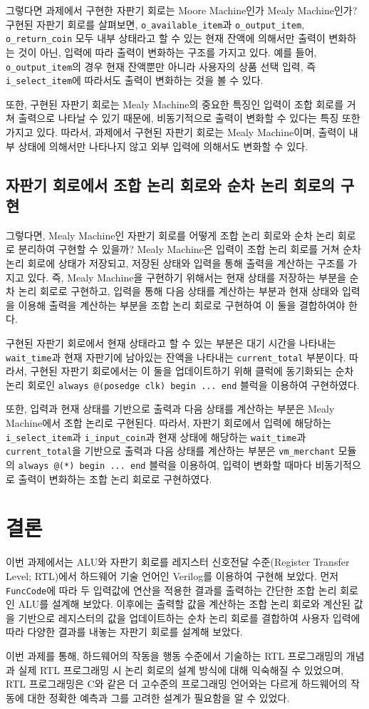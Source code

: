 \documentclass[openright, a4paper]{article}
\newcommand{\code}[1]{\texttt{#1}}
\begin{document}
그렇다면 과제에서 구현한 자판기 회로는 Moore Machine인가 Mealy Machine인가? 구현된 자판기 회로를 살펴보면, \code{o_available_item}과
\code{o_output_item}, \code{o_return_coin} 모두 내부 상태라고 할 수 있는 현재 잔액에 의해서만 출력이 변화하는 것이 아닌, 입력에 따라 출력이
변화하는 구조를 가지고 있다. 예를 들어, \code{o_output_item}의 경우 현재 잔액뿐만 아니라 사용자의 상품 선택 입력, 즉 \code{i_select_item}에
따라서도 출력이 변화하는 것을 볼 수 있다. 

또한, 구현된 자판기 회로는 Mealy Machine의 중요한 특징인 입력이 조합 회로를 거쳐 출력으로 나타날 수 있기 때문에, 비동기적으로 출력이 변화할
수 있다는 특징 또한 가지고 있다. 따라서, 과제에서 구현된 자판기 회로는 Mealy Machine이며, 출력이 내부 상태에 의해서만 나타나지 않고 외부 입력에 의해서도
변화할 수 있다.

\subsection{자판기 회로에서 조합 논리 회로와 순차 논리 회로의 구현}
그렇다면, Mealy Machine인 자판기 회로를 어떻게 조합 논리 회로와 순차 논리 회로로 분리하여 구현할 수 있을까?
Mealy Machine은 입력이 조합 논리 회로를 거쳐 순차 논리 회로에 상태가 저장되고, 저장된 상태와 입력을 통해 출력을 계산하는 구조를 가지고 있다.
즉, Mealy Machine을 구현하기 위해서는 현재 상태를 저장하는 부분을 순차 논리 회로로 구현하고, 입력을 통해 다음 상태를 계산하는 부분과
현재 상태와 입력을 이용해 출력을 계산하는 부분을 조합 논리 회로로 구현하여 이 둘을 결합하여야 한다.

구현된 자판기 회로에서 현재 상태라고 할 수 있는 부분은 대기 시간을 나타내는 \code{wait_time}과 현재 자판기에 남아있는 잔액을 나타내는
\code{current_total} 부분이다. 따라서, 구현된 자판기 회로에서는 이 둘을 업데이트하기 위해 클럭에 동기화되는 순차 논리 회로인
\code{always @(posedge clk) begin ... end} 블럭을 이용하여 구현하였다.

또한, 입력과 현재 상태를 기반으로 출력과 다음 상태를 계산하는 부분은 Mealy Machine에서 조합 논리로 구현된다. 따라서, 자판기 회로에서
입력에 해당하는 \code{i_select_item}과 \code{i_input_coin}과 현재 상태에 해당하는 \code{wait_time}과 \code{current_total}을 기반으로
출력과 다음 상태를 계산하는 부분은 \code{vm_merchant} 모듈의 \code{always @(*) begin ... end} 블럭을 이용하여, 입력이 변화할 때마다
비동기적으로 출력이 변화하는 조합 논리 회로로 구현하였다.

\section{결론}
이번 과제에서는 ALU와 자판기 회로를 레지스터 신호전달 수준(Register Transfer Level; RTL)에서 하드웨어 기술 언어인 Verilog를 이용하여
구현해 보았다. 먼저 \code{FuncCode}에 따라 두 입력값에 연산을 적용한 결과를 출력하는 간단한 조합 논리 회로인 ALU를 설계해 보았다.
이후에는 출력할 값을 계산하는 조합 논리 회로와 계산된 값을 기반으로 레지스터의 값을 업데이트하는 순차 논리 회로를 결합하여 사용자 입력에 따라 
다양한 결과를 내놓는 자판기 회로를 설계해 보았다.

이번 과제를 통해, 하드웨어의 작동을 행동 수준에서 기술하는 RTL 프로그래밍의 개념과 실제 RTL 프로그래밍 시 논리 회로의 설계 방식에 대해
익숙해질 수 있었으며, RTL 프로그래밍은 C와 같은 더 고수준의 프로그래밍 언어와는 다르게 하드웨어의 작동에 대한 정확한 예측과 그를 고려한 설계가
필요함을 알 수 있었다.
\end{document}
